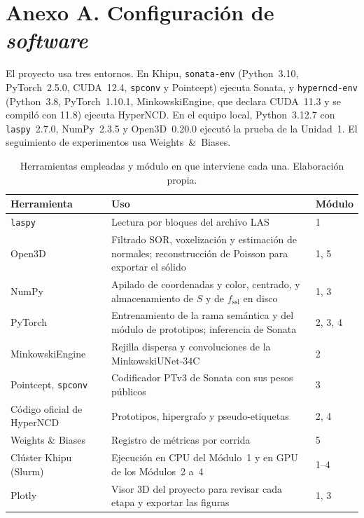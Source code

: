 \appendix
{}

\section*{Anexo A. Configuración de \emph{software}}
\label{sec:anexo-software}
\setcounter{table}{0}

El proyecto usa tres entornos. En Khipu, \texttt{sonata-env} (Python~3.10,
PyTorch~2.5.0, CUDA~12.4, \texttt{spconv} y Pointcept) ejecuta Sonata, y
\texttt{hyperncd-env} (Python~3.8, PyTorch~1.10.1, MinkowskiEngine, que declara
CUDA~11.3 y se compiló con 11.8) ejecuta HyperNCD. En el equipo local, Python~3.12.7
con \texttt{laspy}~2.7.0, NumPy~2.3.5 y Open3D~0.20.0 ejecutó la prueba de la
Unidad~1. El seguimiento de experimentos usa Weights~\&~Biases.

\begin{table}[!htbp]
\centering
{}\small
\caption[Herramientas por módulo]{Herramientas empleadas y módulo en que interviene cada una.
Elaboración propia.}
\label{tab:herramientas}
\begin{tabularx}{\linewidth}{@{}>{\raggedright\arraybackslash\hsize=0.54\hsize}X>{\raggedright\arraybackslash\hsize=1.46\hsize}Xl@{}}
\toprule
\textbf{Herramienta} & \textbf{Uso} & \textbf{Módulo} \\
\midrule
\texttt{laspy} & Lectura por bloques del archivo LAS & 1 \\
Open3D & Filtrado SOR, voxelización y estimación de normales; reconstrucción de Poisson para exportar el sólido & 1, 5 \\
NumPy & Apilado de coordenadas y color, centrado, y almacenamiento de $S$ y de $f_{\mathrm{ssl}}$ en disco & 1, 3 \\
PyTorch & Entrenamiento de la rama semántica y del módulo de prototipos; inferencia de Sonata & 2, 3, 4 \\
MinkowskiEngine & Rejilla dispersa y convoluciones de la MinkowskiUNet-34C & 2 \\
Pointcept, \texttt{spconv} & Codificador PTv3 de Sonata con sus pesos públicos & 3 \\
Código oficial de HyperNCD & Prototipos, hipergrafo y pseudo-etiquetas & 2, 4 \\
Weights \& Biases & Registro de métricas por corrida & 5 \\
Clúster Khipu (Slurm) & Ejecución en CPU del Módulo~1 y en GPU de los Módulos~2 a~4 & 1--4 \\
Plotly & Visor 3D del proyecto para revisar cada etapa y exportar las figuras & 1, 3 \\
\bottomrule
\end{tabularx}
\end{table}


